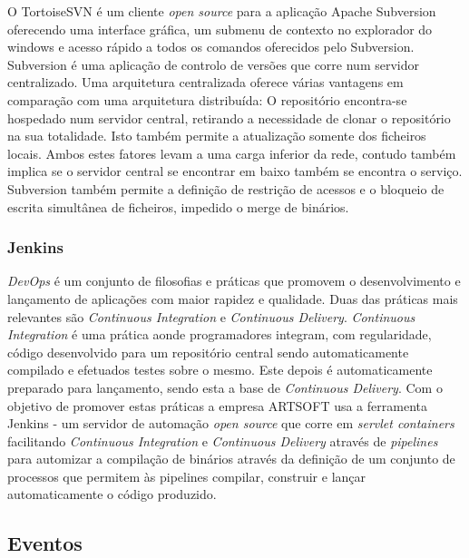 \documentclass[sigplan]{acmart}
\begin{document}
O TortoiseSVN é um cliente \textit{open source} para a aplicação Apache Subversion oferecendo uma interface gráfica, um submenu de contexto no explorador do windows e acesso rápido a todos os comandos oferecidos pelo Subversion. Subversion é uma aplicação de controlo de versões que corre num servidor centralizado. Uma arquitetura centralizada oferece várias vantagens em comparação com uma arquitetura distribuída: O repositório encontra-se hospedado num servidor central, retirando a necessidade de clonar o repositório na sua totalidade. Isto também permite a atualização somente dos ficheiros locais. Ambos estes fatores levam a uma carga inferior da rede, contudo também implica se o servidor central se encontrar em baixo também se encontra o serviço. Subversion também permite a definição de restrição de acessos e o bloqueio de escrita simultânea de ficheiros, impedido o merge de binários.

\subsubsection{Jenkins}

\textit{DevOps} é um conjunto de filosofias e práticas que promovem o desenvolvimento e lançamento de aplicações com maior rapidez e qualidade. Duas das práticas mais relevantes são \textit{Continuous Integration} e \textit{Continuous Delivery}. \textit{Continuous Integration} é uma prática aonde programadores integram, com regularidade, código desenvolvido para um repositório central sendo automaticamente compilado e efetuados testes sobre o mesmo. Este depois é automaticamente preparado para lançamento, sendo esta a base de \textit{Continuous Delivery}. Com o objetivo de promover estas práticas a empresa ARTSOFT usa a ferramenta Jenkins - um servidor de automação \textit{open source} que corre em \textit{servlet containers} facilitando \textit{Continuous Integration} e \textit{Continuous Delivery} através de \textit{pipelines} para automizar a compilação de binários através da definição de um conjunto de processos que permitem às pipelines compilar, construir e lançar automaticamente o código produzido.


\subsection{Eventos}
\end{document}
